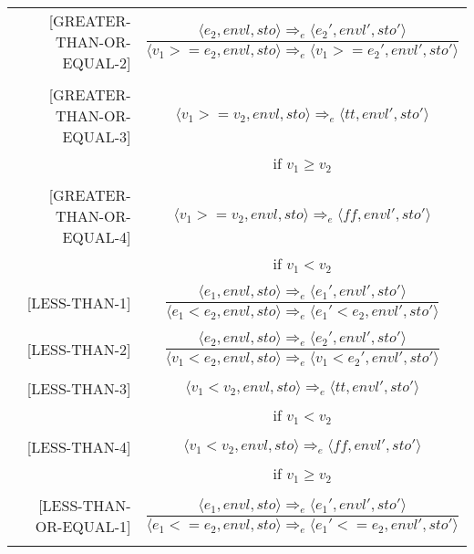\begin{longtable}[c] { r c }
  [GREATER-THAN-OR-EQUAL-2] & \( 
    \dfrac { \langle e_2, envl, sto \rangle \Rightarrow_e \langle e_2', envl', sto' \rangle }
      { \langle v_1 > = e_2, envl, sto \rangle \Rightarrow_e \langle v_1 > = e_2', envl', sto' \rangle } \)
  \\
  & \\

  [GREATER-THAN-OR-EQUAL-3] & \( 
    \langle v_1 > = v_2, envl, sto \rangle \Rightarrow_e \langle tt, envl', sto' \rangle \)
  \\
  & if \( v_1 \geq v_2 \) \\
  & \\

  [GREATER-THAN-OR-EQUAL-4] & \( 
    \langle v_1 > = v_2, envl, sto \rangle \Rightarrow_e \langle ff, envl', sto' \rangle \)
  \\
  & if \( v_1 < v_2 \) \\
  & \\

  [LESS-THAN-1] & \( 
    \dfrac { \langle e_1, envl, sto \rangle \Rightarrow_e \langle e_1', envl', sto' \rangle }
      { \langle e_1 < e_2, envl, sto \rangle \Rightarrow_e \langle e_1' < e_2, envl', sto' \rangle } \)
  \\
  & \\

  [LESS-THAN-2] & \( 
    \dfrac { \langle e_2, envl, sto \rangle \Rightarrow_e \langle e_2', envl', sto' \rangle }
      { \langle v_1 < e_2, envl, sto \rangle \Rightarrow_e \langle v_1 < e_2', envl', sto' \rangle } \)
  \\
  & \\

  [LESS-THAN-3] & \( 
    \langle v_1 < v_2, envl, sto \rangle \Rightarrow_e \langle tt, envl', sto' \rangle \)
  \\
  & if \( v_1 < v_2 \) \\
  & \\

  [LESS-THAN-4] & \( 
    \langle v_1 < v_2, envl, sto \rangle \Rightarrow_e \langle ff, envl', sto' \rangle \)
  \\
  & if \( v_1 \geq v_2 \) \\
  & \\

  [LESS-THAN-OR-EQUAL-1] & \( 
    \dfrac { \langle e_1, envl, sto \rangle \Rightarrow_e \langle e_1', envl', sto' \rangle }
      { \langle e_1 < = e_2, envl, sto \rangle \Rightarrow_e \langle e_1' < = e_2, envl', sto' \rangle } \)
  \\
  & \\


\end{longtable}
